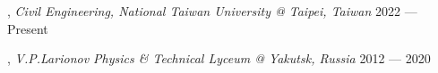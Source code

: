 , \textit{Civil Engineering, National Taiwan University @ Taipei, Taiwan}	\hfill 2022 --- Present


, \textit{V.P.Larionov Physics \& Technical Lyceum @ Yakutsk, Russia}	\hfill 2012 --- 2020

